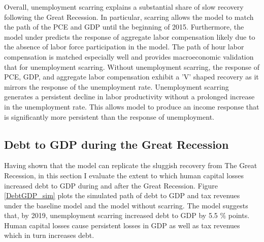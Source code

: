 Overall, unemployment scarring explains a substantial share of slow recovery following the Great Recession. In particular, scarring allows the model to match the path of the PCE and GDP until the beginning of 2015. Furthermore, the model under predicts the response of aggregate labor compensation likely due to the absence of labor force participation in the model. The path of hour labor compensation is matched especially well and provides macroeconomic validation that for unemployment scarring. Without unemployment scarring, the response of PCE, GDP, and aggregate labor compensation exhibit a 'V' shaped recovery as it mirrors the response of the unemployment rate. Unemployment scarring generates a persistent decline in labor productivity without a prolonged increase in the unemployment rate. This allows model to produce an income response that is significantly more persistent than the response of unemployment. 





\subsection{Debt to GDP during the Great Recession}


Having shown that the model can replicate the sluggish recovery from The Great Recession, in this section I evaluate the extent to which human capital losses increased debt to GDP during and after the Great Recession. Figure \ref{DebtGDP_sim} plots the simulated path of debt to GDP and tax revenues under the baseline model and the model without scarring. The model suggests that, by 2019, unemployment scarring increased debt to GDP by 5.5 $\%$ points. Human capital losses cause persistent losses in GDP as well as tax revenues which in turn increases debt.

